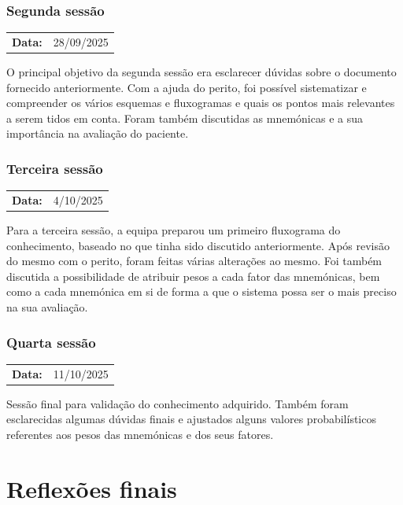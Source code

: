 \documentclass[a4paper,12pt,twoside]{article}
\begin{document}
    \subsubsection{Segunda sessão}
    \begin{tabularx}{0.5\textwidth}{@{}lX@{}}
        \textbf{Data:} & 28/09/2025 \\
    \end{tabularx}

    O principal objetivo da segunda sessão era esclarecer dúvidas sobre o documento fornecido anteriormente. Com a ajuda do perito, foi possível sistematizar e compreender os vários esquemas e fluxogramas e quais os pontos mais relevantes a serem tidos em conta. Foram também discutidas as mnemónicas e a sua importância na avaliação do paciente.

    \subsubsection{Terceira sessão}
    \begin{tabularx}{0.5\textwidth}{@{}lX@{}}
        \textbf{Data:} & 4/10/2025 \\
    \end{tabularx}

    Para a terceira sessão, a equipa preparou um primeiro fluxograma do conhecimento, baseado no que tinha sido discutido anteriormente. Após revisão do mesmo com o perito, foram feitas várias alterações ao mesmo. Foi também discutida a possibilidade de atribuir pesos a cada fator das mnemónicas, bem como a cada mnemónica em si de forma a que o sistema possa ser o mais preciso na sua avaliação.

    \subsubsection{Quarta sessão}
    \begin{tabularx}{0.5\textwidth}{@{}lX@{}}
        \textbf{Data:} & 11/10/2025 \\
    \end{tabularx}

    Sessão final para validação do conhecimento adquirido. Também foram esclarecidas algumas dúvidas finais e ajustados alguns valores probabilísticos referentes aos pesos das mnemónicas e dos seus fatores.

    \newpage


    \section{Reflexões finais}
\end{document}
